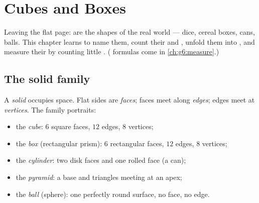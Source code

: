 \chapter{Cubes and Boxes}\label{ch:g5:solids}

Leaving the flat page:  are the shapes of the real world ---
dice, cereal boxes, cans, balls. This chapter learns to name them,
count their  and , unfold them into , and measure
their  by counting little . ( formulas come in
\cref{ch:g6:measure}.)

\section{The solid family}

\begin{definition}\label{def:g5:solids:def}
A \emph{solid} occupies space. Flat sides are
\emph{faces}; faces meet along \emph{edges};
edges meet at \emph{vertices}. The family
portraits:
\begin{itemize}
  \item the \emph{cube}: $6$ square faces, $12$ edges,
        $8$ vertices;
  \item the \emph{box} (rectangular prism): $6$
        rectangular faces, $12$ edges, $8$ vertices;
  \item the \emph{cylinder}: two disk faces and one rolled face
        (a can);
  \item the \emph{pyramid}: a  base and triangles meeting at
        an apex;
  \item the \emph{ball} (sphere): one perfectly round surface, no
        face, no edge.
\end{itemize}
\end{definition}

